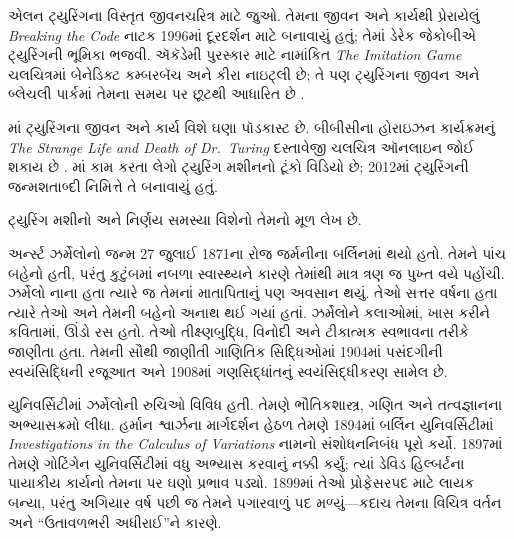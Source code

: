 \begin{reading}
એલન ટ્યુરિંગના
વિસ્તૃત જીવનચરિત્ર
માટે \citet{Hodges2014}
જુઓ. તેમના જીવન
અને કાર્યથી
પ્રેરાયેલું
\emph{Breaking the Code}
નાટક 1996માં
દૂરદર્શન માટે
બનાવાયું હતું;
તેમાં ડેરેક
જેકોબીએ ટ્યુરિંગની
ભૂમિકા ભજવી.
ઍકૅડેમી પુરસ્કાર
માટે નામાંકિત
\emph{The Imitation Game}
ચલચિત્રમાં બેનેડિક્ટ
કમ્બરબૅચ અને
કીરા નાઇટ્લી
છે; તે પણ
ટ્યુરિંગના જીવન
અને બ્લેચલી
પાર્કમાં તેમના
સમય પર છૂટથી
આધારિત છે
\citep{Imitation2014}.

\citet{Radiolab2012}માં
ટ્યુરિંગના જીવન
અને કાર્ય વિશે
ઘણા પૉડકાસ્ટ
છે. બીબીસીના
હોરાઇઝન કાર્યક્રમનું
\emph{The Strange Life and Death of
  Dr.~Turing}
દસ્તાવેજી ચલચિત્ર
ઑનલાઇન જોઈ શકાય
છે \citep{Sykes1992}.
\citep{Theelen2012}માં
કામ કરતા લેગો
ટ્યુરિંગ મશીનનો
ટૂંકો વિડિયો છે;
2012માં ટ્યુરિંગની
જન્મશતાબ્દી નિમિત્તે
તે બનાવાયું હતું.

ટ્યુરિંગ મશીનો
અને નિર્ણય સમસ્યા
વિશેનો તેમનો મૂળ
લેખ \citet{Turing1937}
છે.
\end{reading}
\endgroup


\begingroup
\makeatletter{}\makeatother


\label{guunit:OLP-0632}



અર્ન્સ્ટ ઝર્મેલોનો જન્મ 27 જુલાઈ
1871ના રોજ જર્મનીના બર્લિનમાં
થયો હતો. તેમને પાંચ બહેનો
હતી, પરંતુ કુટુંબમાં નબળા
સ્વાસ્થ્યને કારણે તેમાંથી
માત્ર ત્રણ જ પુખ્ત વયે
પહોંચી. ઝર્મેલો નાના હતા
ત્યારે જ તેમનાં માતાપિતાનું
પણ અવસાન થયું. તેઓ સત્તર
વર્ષના હતા ત્યારે તેઓ અને
તેમની બહેનો અનાથ થઈ
ગયાં હતાં. ઝર્મેલોને કલાઓમાં,
ખાસ કરીને કવિતામાં,
ઊંડો રસ હતો. તેઓ
તીક્ષ્ણબુદ્ધિ, વિનોદી અને
ટીકાત્મક સ્વભાવના
તરીકે જાણીતા હતા.
તેમની સૌથી જાણીતી
ગાણિતિક સિદ્ધિઓમાં
1904માં પસંદગીની
સ્વયંસિદ્ધિની રજૂઆત
અને 1908માં ગણસિદ્ધાંતનું
સ્વયંસિદ્ધીકરણ સામેલ છે.

યુનિવર્સિટીમાં ઝર્મેલોની
રુચિઓ વિવિધ હતી. તેમણે
ભૌતિકશાસ્ત્ર, ગણિત અને
તત્વજ્ઞાનના અભ્યાસક્રમો
લીધા. હર્માન શ્વાર્ઝના
માર્ગદર્શન હેઠળ તેમણે
1894માં બર્લિન
યુનિવર્સિટીમાં
\emph{Investigations in
  the Calculus of Variations}
નામનો સંશોધનનિબંધ
પૂરો કર્યો. 1897માં
તેમણે ગોટિંગેન
યુનિવર્સિટીમાં વધુ
અભ્યાસ કરવાનું નક્કી
કર્યું; ત્યાં ડેવિડ
હિલ્બર્ટના પાયાકીય
કાર્યનો તેમના પર
ઘણો પ્રભાવ પડ્યો.
1899માં તેઓ પ્રોફેસરપદ
માટે લાયક બન્યા,
પરંતુ અગિયાર વર્ષ
પછી જ તેમને પગારવાળું પદ
મળ્યું—કદાચ તેમના
વિચિત્ર વર્તન અને
“ઉતાવળભરી અધીરાઈ”ને
કારણે.

